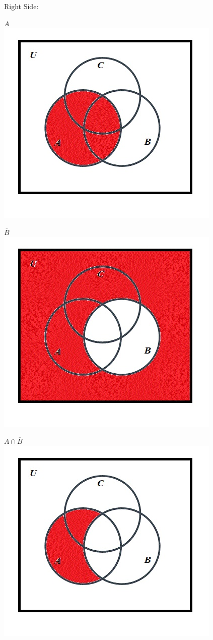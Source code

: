\documentclass[10pt]{article}
\begin{document}
Right Side:

$A$\\
\includegraphics[scale=0.55]{12}

$\overline{B}$\\
\includegraphics[scale=0.55]{17}

$A \cap \overline{B}$\\
\includegraphics[scale=0.55]{18}
\end{document}
